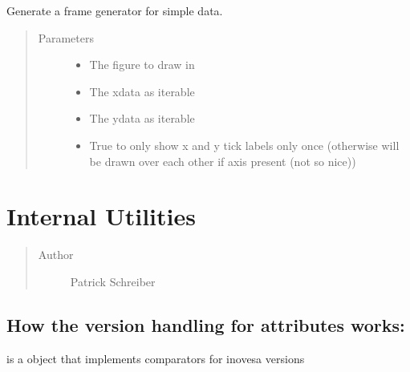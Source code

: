\documentclass[letterpaper,10pt,openany,oneside,english]{sphinxmanual}
\begin{document}

\begin{fulllineitems}
\label{\detokenize{animation:animation.data_frame_generator}}
Generate a frame generator for simple data.
\begin{quote}\begin{description}
\item[{Parameters}] \leavevmode\begin{itemize}
\item {} 
 \textendash{} The figure to draw in

\item {} 
 \textendash{} The xdata as iterable

\item {} 
 \textendash{} The ydata as iterable

\item {} 
 \textendash{} True to only show x and y tick labels only once  
(otherwise will be drawn over each other if axis present (not so nice))

\end{itemize}

\end{description}\end{quote}

\end{fulllineitems}

\label{\detokenize{utils:module-utils}}

\chapter{Internal Utilities}
\label{\detokenize{utils:utils}}\label{\detokenize{utils:internal-utilities}}\label{\detokenize{utils::doc}}\begin{quote}\begin{description}
\item[{Author}] \leavevmode
Patrick Schreiber

\end{description}\end{quote}


\section{How the version handling for attributes works:}
\label{\detokenize{utils:how-the-version-handling-for-attributes-works}}
 is a object that implements comparators for inovesa versions
\end{document}
